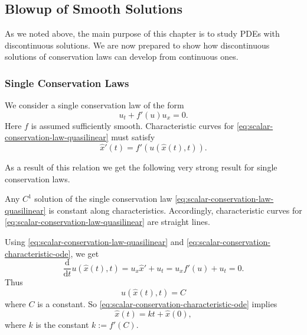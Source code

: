 \subsection{Blowup of Smooth Solutions}\label{sec:conservation-smooth-blowup}

As we noted above, the main purpose of this chapter is to study PDEs with discontinuous solutions. We are now prepared to show how discontinuous solutions of conservation laws can develop from continuous ones.

\subsubsection{Single Conservation Laws}\label{subsec:scalar-conservation-blowup}

We consider a single conservation law of the form
\begin{equation}\label{eq:scalar-conservation-law-quasilinear}
u_t+f'(u)u_x=0.
\end{equation}
Here $f$ is assumed sufficiently smooth. Characteristic curves for \eqref{eq:scalar-conservation-law-quasilinear} must satisfy
\begin{equation}\label{eq:scalar-conservation-characteristic-ode}
\hat x'(t)=f'(u(\hat x(t),t)).
\end{equation}


As a result of this relation we get the following very strong result for single conservation laws.

\begin{Theorem}
\label{thm:scalar-constant-characteristics}
Any $C^1$ solution of the single conservation law \eqref{eq:scalar-conservation-law-quasilinear} is constant along characteristics. Accordingly, characteristic curves for \eqref{eq:scalar-conservation-law-quasilinear} are straight lines.
\end{Theorem}

\begin{Proof}
Using \eqref{eq:scalar-conservation-law-quasilinear} and \eqref{eq:scalar-conservation-characteristic-ode}, we get
\begin{equation}\label{eq:scalar-solution-constant-along-characteristics}
\dfrac{\mathrm{d}}{\mathrm{d}t}u(\hat x(t),t)=u_x\hat x'+u_t=u_xf'(u)+u_t=0.
\end{equation}
Thus
\begin{equation}\label{eq:scalar-characteristic-constant-value}
u(\hat x(t),t)=C
\end{equation}
where $C$ is a constant. So \eqref{eq:scalar-conservation-characteristic-ode} implies
\begin{equation}\label{eq:scalar-straight-characteristic-line}
\hat x(t)=kt+\hat x(0),
\end{equation}
where $k$ is the constant $k:=f'(C)$.
\end{Proof}

